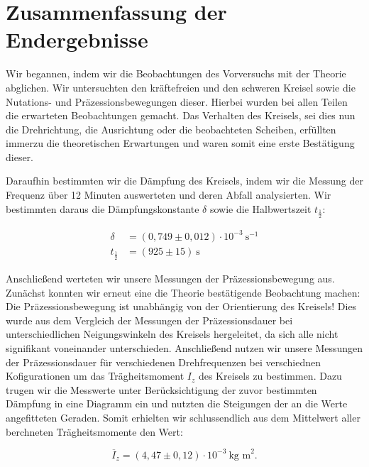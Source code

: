 \documentclass{article}
\begin{document}
\clearpage
\newpage
\section{Zusammenfassung der Endergebnisse}

Wir begannen, indem wir die Beobachtungen des Vorversuchs mit der Theorie abglichen. Wir untersuchten den kräftefreien und den schweren Kreisel sowie die Nutations- und Präzessionsbewegungen dieser. Hierbei wurden bei allen Teilen die erwarteten Beobachtungen gemacht. Das Verhalten des Kreisels, sei dies nun die Drehrichtung,  die Ausrichtung oder die beobachteten Scheiben, erfüllten immerzu die theoretischen Erwartungen und waren somit eine erste Bestätigung dieser.

Daraufhin bestimmten wir die Dämpfung des Kreisels, indem wir die Messung der Frequenz über 12 Minuten auswerteten und deren Abfall analysierten. Wir bestimmten daraus die Dämpfungskonstante $\delta$ sowie die Halbwertszeit $t_\frac{1}{2}$:

\begin{equation}
    \begin{split}
        \delta &= (0,749 \pm 0,012) \cdot 10^{-3} \ \text{s}^{-1} \\
        t_{\frac{1}{2}} &= (925 \pm 15) \ \text{s}
    \end{split}
\end{equation}

Anschließend werteten wir unsere Messungen der Präzessionsbewegung aus. Zunächst konnten wir erneut eine die Theorie bestätigende Beobachtung machen: Die Präzessionsbewegung ist unabhängig von der Orientierung des Kreisels! Dies wurde aus dem Vergleich der Messungen der Präzessionsdauer bei unterschiedlichen Neigungswinkeln des Kreisels hergeleitet, da sich alle nicht signifikant voneinander unterschieden. Anschließend nutzen wir unsere Messungen der Präzessionsdauer für verschiedenen Drehfrequenzen bei verschiednen Kofigurationen um das Trägheitsmoment $I_z$ des Kreisels zu bestimmen. Dazu trugen wir die Messwerte unter Berücksichtigung der zuvor bestimmten Dämpfung in eine Diagramm ein und nutzten die Steigungen der an die Werte angefitteten Geraden. Somit erhielten wir schlussendlich aus dem Mittelwert aller berchneten Trägheitsmomente den Wert:

\begin{equation}
    \overline{I}_z = (4,47 \pm 0,12) \cdot 10^{-3} \ \text{kg m}^2.
\end{equation}
\end{document}
